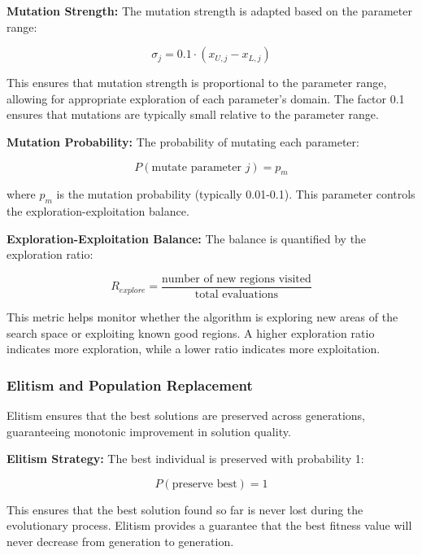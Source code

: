 \documentclass[12pt,a4paper]{article}
\begin{document}
\textbf{Mutation Strength:} The mutation strength is adapted based on the parameter range:

\begin{equation}\label{Eq.mutation_strength}
\sigma_j = 0.1 \cdot (x_{U,j} - x_{L,j})
\end{equation}

This ensures that mutation strength is proportional to the parameter range, allowing for appropriate exploration of each parameter's domain. The factor 0.1 ensures that mutations are typically small relative to the parameter range.

\textbf{Mutation Probability:} The probability of mutating each parameter:

\begin{equation}\label{Eq.mutation_probability}
P(\text{mutate parameter } j) = p_m
\end{equation}

where $p_m$ is the mutation probability (typically 0.01-0.1). This parameter controls the exploration-exploitation balance.

\textbf{Exploration-Exploitation Balance:} The balance is quantified by the exploration ratio:

\begin{equation}\label{Eq.exploration_ratio}
R_{explore} = \frac{\text{number of new regions visited}}{\text{total evaluations}}
\end{equation}

This metric helps monitor whether the algorithm is exploring new areas of the search space or exploiting known good regions. A higher exploration ratio indicates more exploration, while a lower ratio indicates more exploitation.

\subsubsection{Elitism and Population Replacement}

Elitism ensures that the best solutions are preserved across generations, guaranteeing monotonic improvement in solution quality.

\textbf{Elitism Strategy:} The best individual is preserved with probability 1:

\begin{equation}\label{Eq.elitism_probability}
P(\text{preserve best}) = 1
\end{equation}

This ensures that the best solution found so far is never lost during the evolutionary process. Elitism provides a guarantee that the best fitness value will never decrease from generation to generation.
\end{document}
